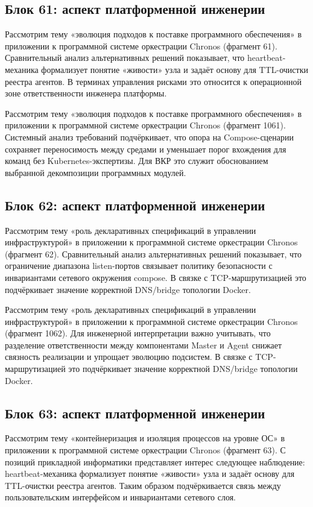 \subsection{Блок 61: аспект платформенной инженерии}
 Рассмотрим тему «эволюция подходов к поставке программного обеспечения» в приложении к программной системе оркестрации Chronos (фрагмент 61). Сравнительный анализ альтернативных решений показывает, что heartbeat-механика формализует понятие «живости» узла и задаёт основу для TTL-очистки реестра агентов. В терминах управления рисками это относится к операционной зоне ответственности инженера платформы.

 Рассмотрим тему «эволюция подходов к поставке программного обеспечения» в приложении к программной системе оркестрации Chronos (фрагмент 1061). Системный анализ требований подчёркивает, что опора на Compose-сценарии сохраняет переносимость между средами и уменьшает порог вхождения для команд без Kubernetes-экспертизы. Для ВКР это служит обоснованием выбранной декомпозиции программных модулей.

\subsection{Блок 62: аспект платформенной инженерии}
 Рассмотрим тему «роль декларативных спецификаций в управлении инфраструктурой» в приложении к программной системе оркестрации Chronos (фрагмент 62). Сравнительный анализ альтернативных решений показывает, что ограничение диапазона listen-портов связывает политику безопасности с инвариантами сетевого окружения compose. В связке с TCP-маршрутизацией это подчёркивает значение корректной DNS/bridge топологии Docker.

 Рассмотрим тему «роль декларативных спецификаций в управлении инфраструктурой» в приложении к программной системе оркестрации Chronos (фрагмент 1062). Для инженерной интерпретации важно учитывать, что разделение ответственности между компонентами Master и Agent снижает связность реализации и упрощает эволюцию подсистем. В связке с TCP-маршрутизацией это подчёркивает значение корректной DNS/bridge топологии Docker.

\subsection{Блок 63: аспект платформенной инженерии}
 Рассмотрим тему «контейнеризация и изоляция процессов на уровне ОС» в приложении к программной системе оркестрации Chronos (фрагмент 63). С позиций прикладной информатики представляет интерес следующее наблюдение: heartbeat-механика формализует понятие «живости» узла и задаёт основу для TTL-очистки реестра агентов. Таким образом подчёркивается связь между пользовательским интерфейсом и инвариантами сетевого слоя.


